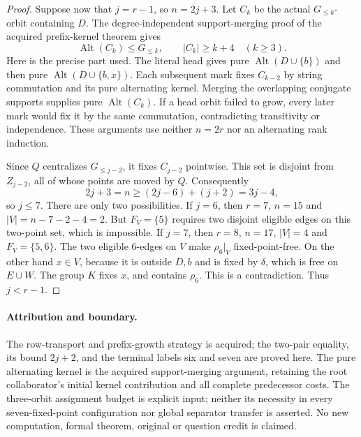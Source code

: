 \documentclass[11pt,a4paper]{article}
\newcommand{\Alt}{\operatorname{Alt}}
\begin{document}
\begin{proof}
Suppose now that $j=r-1$, so $n=2j+3$.
Let $C_k$ be the actual $G_{\le k}$-orbit containing
$D$. The degree-independent support-merging proof
of the acquired prefix-kernel theorem gives
\[
 \Alt(C_k)\le G_{\le k},\qquad |C_k|\ge k+4\quad(k\ge3).
\]
Here is the precise part used. The literal head gives
pure $\Alt(D\cup\{b\})$ and then
pure $\Alt(D\cup\{b,x\})$. Each subsequent mark
fixes $C_{k-2}$ by string commutation and its pure
alternating kernel. Merging the overlapping conjugate
supports supplies pure $\Alt(C_k)$. If a head orbit
failed to grow, every later mark would fix it by the
same commutation, contradicting transitivity or
independence. These arguments use neither $n=2r$
nor an alternating rank induction.

Since $Q$ centralizes $G_{\le j-2}$, it fixes
$C_{j-2}$ pointwise. This set is disjoint from
$Z_{j-2}$, all of whose points are moved by $Q$.
Consequently
\[
                  2j+3=n\ge(2j-6)+(j+2)=3j-4,
\]
so $j\le7$. There are only two possibilities.
If $j=6$, then $r=7$, $n=15$ and
$|V|=n-7-2-4=2$. But $F_V=\{5\}$ requires two
disjoint eligible edges on this two-point set,
which is impossible. If $j=7$, then $r=8$,
$n=17$, $|V|=4$ and $F_V=\{5,6\}$.
The two eligible $6$-edges on $V$ make
$\rho_6|_V$ fixed-point-free. On the other hand
$x\in V$, because it is outside $D,b$ and is
fixed by $\delta$, which is free on $E\cup W$.
The group $K$ fixes $x$, and contains $\rho_6$.
This is a contradiction. Thus $j<r-1$.
\end{proof}

\paragraph{Attribution and boundary.}
The row-transport and prefix-growth strategy is acquired;
the two-pair equality, its bound $2j+2$, and the terminal
labels six and seven are proved here. The pure alternating
kernel is the acquired support-merging argument, retaining
the root collaborator's initial kernel contribution and
all complete predecessor costs. The three-orbit assignment
budget is explicit input; neither its necessity in every
seven-fixed-point configuration nor global separator
transfer is asserted. No new computation, formal theorem,
original or question credit is claimed.
\end{document}
